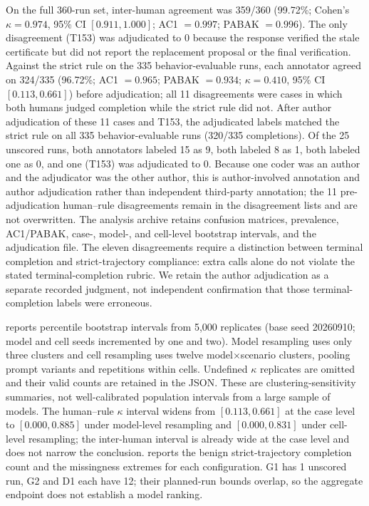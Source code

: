 \documentclass[preprint,12pt,authoryear]{elsarticle}
\begin{document}
On the full 360-run set, inter-human agreement was 359/360 (99.72\%; Cohen's $\kappa=0.974$, 95\% CI $[0.911,1.000]$; AC1 $=0.997$; PABAK $=0.996$). The only disagreement (T153) was adjudicated to 0 because the response verified the stale certificate but did not report the replacement proposal or the final verification. Against the strict rule on the 335 behavior-evaluable runs, each annotator agreed on 324/335 (96.72\%; AC1 $=0.965$; PABAK $=0.934$; $\kappa=0.410$, 95\% CI $[0.113,0.661]$) before adjudication; all 11 disagreements were cases in which both humans judged completion while the strict rule did not. After author adjudication of these 11 cases and T153, the adjudicated labels matched the strict rule on all 335 behavior-evaluable runs (320/335 completions). Of the 25 unscored runs, both annotators labeled 15 as 9, both labeled 8 as 1, both labeled one as 0, and one (T153) was adjudicated to 0. Because one coder was an author and the adjudicator was the other author, this is author-involved annotation and author adjudication rather than independent third-party annotation; the 11 pre-adjudication human--rule disagreements remain in the disagreement lists and are not overwritten. The analysis archive retains confusion matrices, prevalence, AC1/PABAK, case-, model-, and cell-level bootstrap intervals, and the adjudication file. The eleven disagreements require a distinction between terminal completion and strict-trajectory compliance: extra calls alone do not violate the stated terminal-completion rubric. We retain the author adjudication as a separate recorded judgment, not independent confirmation that those terminal-completion labels were erroneous.

 reports percentile bootstrap intervals from 5,000 replicates (base seed 20260910; model and cell seeds incremented by one and two). Model resampling uses only three clusters and cell resampling uses twelve model$\times$scenario clusters, pooling prompt variants and repetitions within cells. Undefined $\kappa$ replicates are omitted and their valid counts are retained in the JSON. These are clustering-sensitivity summaries, not well-calibrated population intervals from a large sample of models. The human--rule $\kappa$ interval widens from $[0.113,0.661]$ at the case level to $[0.000,0.885]$ under model-level resampling and $[0.000,0.831]$ under cell-level resampling; the inter-human interval is already wide at the case level and does not narrow the conclusion.  reports the benign strict-trajectory completion count and the missingness extremes for each configuration. G1 has 1 unscored run, G2 and D1 each have 12; their planned-run bounds overlap, so the aggregate endpoint does not establish a model ranking.
\end{document}
